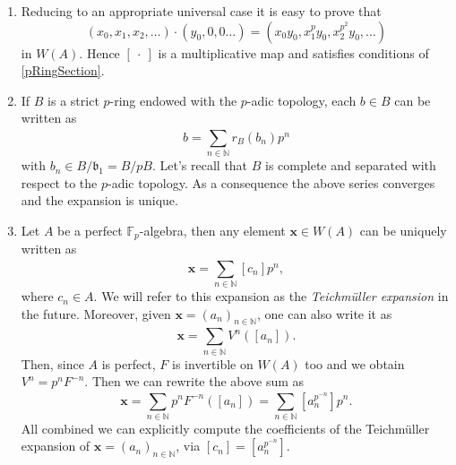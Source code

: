 \begin{rem}[]\leavevmode\vspace{-.2\baselineskip}\label{TeichmullerExpansionWitt}
\begin{enumerate}
\item Reducing to an appropriate universal case it is easy to prove that
	\begin{equation*}
		(x_0, x_1, x_2, \ldots) \cdot (y_0, 0, 0 \ldots) =
		(x_0y_0, x_1^py_0, x_2^{p^2}y_0, \ldots)
	\end{equation*}
	in $W(A)$.
	Hence $[\ \cdot\ ]$ is a multiplicative map
	and satisfies conditions of \cref{pRingSection}.

\item If $B$ is a strict $p$-ring endowed with the $p$-adic topology,
	each $b \in B$ can be written as
	\begin{equation*}
		b = \sum_{n \in \mathbb{N} }^{  } r_B(b_n) p^n
	\end{equation*}
	with $b_n \in B/\mathfrak{b}_1 = B/pB$.
	Let's recall that $B$ is complete and separated with respect to the $p$-adic
	topology.
	As a consequence the above series converges and the expansion is unique.

\item Let $A$ be a perfect $\mathbb{F}_p$-algebra, then any element $\mathbf{x} \in W(A)$
	can be uniquely written as
	\begin{equation*}
		\mathbf{x} = \sum_{n \in \mathbb{N} }^{  } [c_n] p^n
	,\end{equation*}
	where $c_n \in A$.
	We will refer to this expansion as the {\em Teichmüller expansion} in the future.
	Moreover, given $\mathbf{x} = \left( a_n \right)_{n \in \mathbb{N}}$, one can also write it as
	\begin{equation*}
		\mathbf{x} = \sum_{n \in \mathbb{N} }^{  } V^n([a_n])
	.\end{equation*}
	Then, since $A$ is perfect, $F$ is invertible on $W(A)$ too
	and we obtain $V^n = p^n F^{-n}$. Then we can rewrite the above sum as
	\begin{equation*}
		\mathbf{x} = 
		\sum_{n \in \mathbb{N} }^{  } p^n F^{-n}([a_n]) =
		\sum_{n \in \mathbb{N} } [a_n^{p^{-n}}] p^n
	.\end{equation*}
	All combined we can explicitly compute the coefficients
	of the Teichmüller expansion of $\mathbf{x} = \left( a_n \right)_{n \in \mathbb{N}}$,
	via $[c_n] = [a_n^{p^{-n}}]$.
\end{enumerate}
\end{rem}


